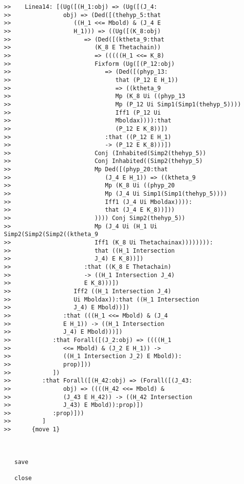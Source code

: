 \documentclass[12pt]{article}
\begin{document}
\begin{verbatim}
>>    Linea14: [(Ug([(H_1:obj) => (Ug([(J_4:
>>               obj) => (Ded([(thehyp_5:that
>>                  ((H_1 <<= Mbold) & (J_4 E
>>                  H_1))) => ((Ug([(K_8:obj)
>>                     => (Ded([(ktheta_9:that
>>                        (K_8 E Thetachain))
>>                        => (((((H_1 <<= K_8)
>>                        Fixform (Ug([(P_12:obj)
>>                           => (Ded([(phyp_13:
>>                              that (P_12 E H_1))
>>                              => ((ktheta_9
>>                              Mp (K_8 Ui ((phyp_13
>>                              Mp (P_12 Ui Simp1(Simp1(thehyp_5))))
>>                              Iff1 (P_12 Ui
>>                              Mboldax)))):that
>>                              (P_12 E K_8))])
>>                           :that ((P_12 E H_1)
>>                           -> (P_12 E K_8)))])
>>                        Conj (Inhabited(Simp2(thehyp_5))
>>                        Conj Inhabited((Simp2(thehyp_5)
>>                        Mp Ded([(phyp_20:that
>>                           (J_4 E H_1)) => ((ktheta_9
>>                           Mp (K_8 Ui ((phyp_20
>>                           Mp (J_4 Ui Simp1(Simp1(thehyp_5))))
>>                           Iff1 (J_4 Ui Mboldax)))):
>>                           that (J_4 E K_8))]))
>>                        )))) Conj Simp2(thehyp_5))
>>                        Mp (J_4 Ui (H_1 Ui Simp2(Simp2(Simp2((ktheta_9
>>                        Iff1 (K_8 Ui Thetachainax)))))))):
>>                        that ((H_1 Intersection
>>                        J_4) E K_8))])
>>                     :that ((K_8 E Thetachain)
>>                     -> ((H_1 Intersection J_4)
>>                     E K_8)))])
>>                  Iff2 ((H_1 Intersection J_4)
>>                  Ui Mboldax)):that ((H_1 Intersection
>>                  J_4) E Mbold))])
>>               :that (((H_1 <<= Mbold) & (J_4
>>               E H_1)) -> ((H_1 Intersection
>>               J_4) E Mbold)))])
>>            :that Forall([(J_2:obj) => ((((H_1
>>               <<= Mbold) & (J_2 E H_1)) ->
>>               ((H_1 Intersection J_2) E Mbold)):
>>               prop)]))
>>            ])
>>         :that Forall([(H_42:obj) => (Forall([(J_43:
>>               obj) => ((((H_42 <<= Mbold) &
>>               (J_43 E H_42)) -> ((H_42 Intersection
>>               J_43) E Mbold)):prop)])
>>            :prop)]))
>>         ]
>>      {move 1}



   save

   close


\end{verbatim}
\end{document}
